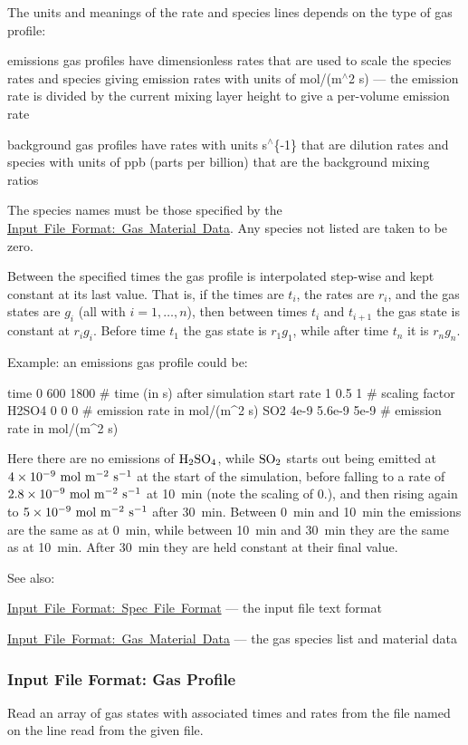 The units and meanings of the rate and species lines depends on the type of gas profile\+:
\begin{DoxyItemize}
\item emissions gas profiles have dimensionless rates that are used to scale the species rates and species giving emission rates with units of mol/(m$^\wedge$2 s) --- the emission rate is divided by the current mixing layer height to give a per-\/volume emission rate
\item background gas profiles have rates with units s$^\wedge$\{-\/1\} that are dilution rates and species with units of ppb (parts per billion) that are the background mixing ratios
\end{DoxyItemize}

The species names must be those specified by the \mbox{\hyperlink{input_format_gas_data}{Input File Format\+: Gas Material Data}}. Any species not listed are taken to be zero.

Between the specified times the gas profile is interpolated step-\/wise and kept constant at its last value. That is, if the times are $t_i$, the rates are $r_i$, and the gas states are $g_i$ (all with $i = 1,\ldots,n$), then between times $t_i$ and $t_{i+1}$ the gas state is constant at $r_i g_i$. Before time $t_1$ the gas state is $r_1 g_1$, while after time $t_n$ it is $r_n g_n$.

Example\+: an emissions gas profile could be\+: 
\begin{DoxyPre}
 time   0       600     1800    \# time (in s) after simulation start
 rate   1       0.5     1       \# scaling factor
 H2SO4  0       0       0       \# emission rate in mol/(m^2 s)
 SO2    4e-9    5.6e-9  5e-9    \# emission rate in mol/(m^2 s)
 \end{DoxyPre}
 Here there are no emissions of $\rm H_2SO_4$, while $\rm SO_2$ starts out being emitted at $4\times 10^{-9}\rm\ mol\ m^{-2}\ s^{-1}$ at the start of the simulation, before falling to a rate of $2.8\times 10^{-9}\rm\ mol\ m^{-2}\ s^{-1}$ at 10~min (note the scaling of 0.), and then rising again to $5\times 10^{-9}\rm\ mol\ m^{-2}\ s^{-1}$ after 30~min. Between 0~min and 10~min the emissions are the same as at 0~min, while between 10~min and 30~min they are the same as at 10~min. After 30~min they are held constant at their final value.

See also\+:
\begin{DoxyItemize}
\item \mbox{\hyperlink{spec_file_format}{Input File Format\+: Spec File Format}} --- the input file text format
\item \mbox{\hyperlink{input_format_gas_data}{Input File Format\+: Gas Material Data}} --- the gas species list and material data 
\end{DoxyItemize}\hypertarget{input_format_gas_profile}{}\subsubsection{Input File Format\+: Gas Profile}\label{input_format_gas_profile}
Read an array of gas states with associated times and rates from the file named on the line read from the given file.


